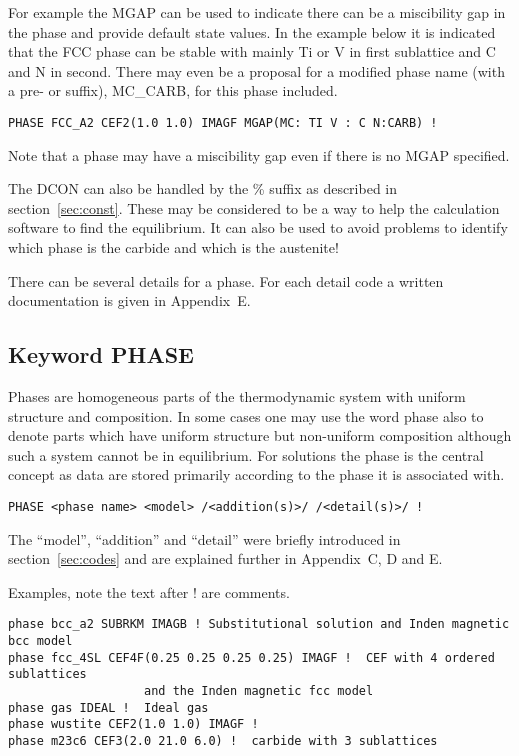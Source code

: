 \documentclass[12pt]{article}
\begin{document}
For example the MGAP can be used to indicate there can be a
miscibility gap in the phase and provide default state values.  In the
example below it is indicated that the FCC phase can be stable with
mainly Ti or V in first sublattice and C and N in second.  There may
even be a proposal for a modified phase name (with a pre- or suffix),
MC\_CARB, for this phase included.

\begin{verbatim}
PHASE FCC_A2 CEF2(1.0 1.0) IMAGF MGAP(MC: TI V : C N:CARB) !
\end{verbatim}

Note that a phase may have a miscibility gap even if there is no MGAP
specified.

The DCON can also be handled by the \% suffix as described in
section~\ref{sec:const}.  These may be considered to be a way to help
the calculation software to find the equilibrium.  It can also be used
to avoid problems to identify which phase is the carbide and which is
the austenite!

There can be several details for a phase.  For each detail code a
written documentation is given in Appendix~E.

\subsection{Keyword PHASE}

Phases are homogeneous parts of the thermodynamic system with uniform
structure and composition.  In some cases one may use the word phase
also to denote parts which have uniform structure but non-uniform
composition although such a system cannot be in equilibrium.  For
solutions the phase is the central concept as data are stored
primarily according to the phase it is associated with.

\begin{verbatim}
PHASE <phase name> <model> /<addition(s)>/ /<detail(s)>/ !
\end{verbatim}

The ``model'', ``addition'' and ``detail'' were briefly introduced in
section~\ref{sec:codes} and are explained further in Appendix~C, D and
E.

Examples, note the text after ! are comments.

\begin{verbatim}
phase bcc_a2 SUBRKM IMAGB ! Substitutional solution and Inden magnetic bcc model
phase fcc_4SL CEF4F(0.25 0.25 0.25 0.25) IMAGF !  CEF with 4 ordered sublattices
                   and the Inden magnetic fcc model
phase gas IDEAL !  Ideal gas
phase wustite CEF2(1.0 1.0) IMAGF ! 
phase m23c6 CEF3(2.0 21.0 6.0) !  carbide with 3 sublattices
\end{verbatim}
\end{document}
